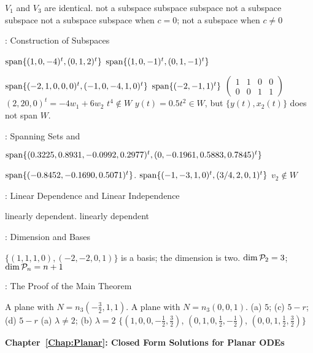  $V_1$ and $V_3$ are identical.
 \ans not a subspace
 subspace
 subspace
 \ans not a subspace
 \ans subspace
 \ans not a subspace
 \ans subspace when $c = 0$; not a subspace when $c \neq 0$ 

:  Construction of Subspaces

 \ans ${\rm span}\{(1,0,-4)^t,(0,1,2)^t\}$
  \ans  ${\rm span}\{(1,0,-1)^t,(0,1,-1)^t\}$

 \ans ${\rm span}\{(-2,1,0,0,0)^t,(-1,0,-4,1,0)^t\}$
 \ans ${\rm span}\{(-2,-1,1)^t\}$
\ans $\left(\begin{array}{rrrr} 1 & 1 & 0 & 0 \\ 0 & 0 & 1 & 1
\end{array}\right)$
 \ans $(2,20,0)^t = -4w_1 + 6w_2$
 $t^4\not\in W$
 \ans $y(t) = 0.5t^2\in W$, but $\{y(t),x_2(t)\}$ does not 
span $W$.


:  Spanning Sets and \Matlab


  ${\rm span}\{(0.3225, 0.8931, -0.0992, 0.2977)^t,
(0,-0.1961,0.5883,0.7845)^t\}$

 ${\rm span}\{(-0.8452,-0.1690,0.5071)^t\}$.
 \ans ${\rm span}\{(-1, -3, 1, 0)^t, (3/4, 2, 0, 1)^t\}$
 \ans $v_2\not\in W$

:  Linear Dependence and Linear Independence

 \ans linearly dependent.
 \ans linearly dependent


:   Dimension and Bases


\ans $\{(1,1,1,0), (-2,-2,0,1)\}$ is a basis; the dimension is two.
 $\dim {\cal P}_2=3$; $\dim {\cal P}_n = n+1$


:  The Proof of the Main Theorem

 \ans  A plane with $N = n_3(-\frac{3}{2}, 1, 1)$.
 \ans A plane with $N = n_3(0,0,1)$.
(a) $5$; (c)  $5 - r$; (d) $5 - r$
(a) \ans $\lambda \neq 2$; (b) $\lambda = 2$
 \ans $\{(1,0,0,-\frac{1}{2},\frac{3}{2})$, $(0,1,0,\frac{1}{2},
-\frac{1}{2})$, $(0,0,1,\frac{1}{2},\frac{3}{2})\}$ 


\vspace{0.08in}
{\bf Chapter~\ref{Chap:Planar}: Closed Form Solutions for Planar ODEs}

